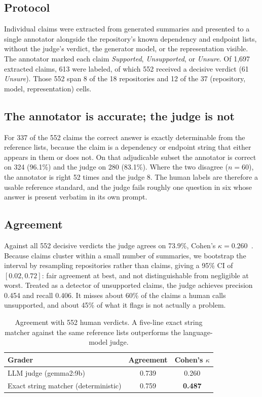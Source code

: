 \documentclass[conference]{IEEEtran}
\begin{document}
\subsection{Protocol}
Individual claims were extracted from generated summaries and presented to a single annotator
alongside the repository's known dependency and endpoint lists, without the judge's verdict, the
generator model, or the representation visible. The annotator marked each claim
\emph{Supported}, \emph{Unsupported}, or \emph{Unsure}. Of 1{,}697 extracted claims, 613 were
labeled, of which 552 received a decisive verdict (61 \emph{Unsure}). Those 552 span 8 of the 18
repositories and 12 of the 37 (repository, model, representation) cells.

\subsection{The annotator is accurate; the judge is not}
For 337 of the 552 claims the correct answer is exactly determinable from the reference lists,
because the claim is a dependency or endpoint string that either appears in them or does not. On
that adjudicable subset the annotator is correct on 324 (96.1\%) and the judge on 280 (83.1\%).
Where the two disagree ($n=60$), the annotator is right 52 times and the judge 8. The human
labels are therefore a usable reference standard, and the judge fails roughly one question in
six whose answer is present verbatim in its own prompt.

\subsection{Agreement}
Against all 552 decisive verdicts the judge agrees on 73.9\%, Cohen's $\kappa =
0.260$~\cite{cohen1960coefficient}. Because claims cluster within a small number of summaries, we
bootstrap the interval by resampling repositories rather than claims, giving a 95\% CI of
$[0.02, 0.72]$: fair agreement at best, and not distinguishable from negligible at worst.
Treated as a detector of unsupported claims, the judge achieves precision 0.454 and recall
0.406. It misses about 60\% of the claims a human calls unsupported, and about 45\% of what it
flags is not actually a problem.

\begin{table}[htbp]
\caption{Agreement with 552 human verdicts. A five-line exact string matcher against the same
reference lists outperforms the language-model judge.}
\label{tab:human}
\centering
\footnotesize
\begin{tabular}{@{}lcc@{}}
\toprule
Grader & Agreement & Cohen's $\kappa$ \\
\midrule
LLM judge (gemma2:9b) & 0.739 & 0.260 \\
Exact string matcher (deterministic) & 0.759 & \textbf{0.487} \\
\bottomrule
\end{tabular}
\end{table}
\end{document}
